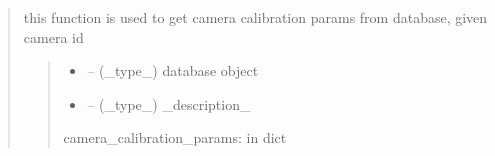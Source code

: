 \documentclass[letterpaper,10pt,english]{sphinxmanual}
\begin{document}
\begin{quote}
\begin{savenotes}
\begin{fulllineitems}
\begin{quote}
\begin{description}
\end{description}\end{quote}

\end{fulllineitems}\end{savenotes}


\begin{savenotes}\begin{fulllineitems}
\label{\detokenize{setting/backend/camera_funcs:oxin.backend.camera_funcs.get_camera_calibration_params_from_db}}
\pysigstartsignatures
{}
\pysigstopsignatures
\sphinxAtStartPar
this function is used to get camera calibration params from database, given camera id
\begin{quote}\begin{description}
\begin{itemize}
\item {} 
\sphinxAtStartPar
{} – (\_type\_) database object

\item {} 
\sphinxAtStartPar
{} – (\_type\_) \_description\_

\end{itemize}

\sphinxAtStartPar
camera\_calibration\_params: in dict

\end{description}\end{quote}

\end{fulllineitems}\end{savenotes}



\end{quote}
\end{document}
